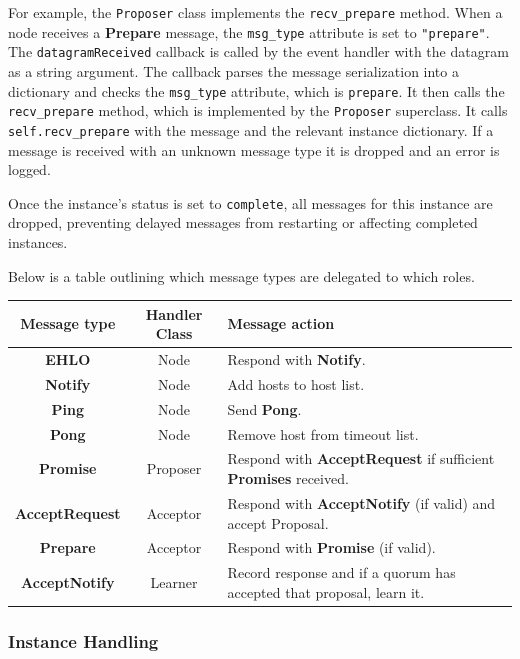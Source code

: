 \documentclass[12pt,twoside,notitlepage]{report}
\newcommand{\msg}[1] {{\bf #1}}         %
\begin{document}
For example, the \verb+Proposer+ class implements the \verb+recv_prepare+ method. When a node
receives a \msg{Prepare} message, the \verb+msg_type+ attribute is set to \verb+"prepare"+. The
\verb+datagramReceived+ callback is called by the event handler with the datagram as a string
argument. The callback parses the message serialization into a dictionary and checks the
\verb+msg_type+ attribute, which is \verb+prepare+. It then calls the \verb+recv_prepare+
method, which is implemented by the \verb+Proposer+ superclass. It calls \verb+self.recv_prepare+
with the message and the relevant instance dictionary. If a message is received with an unknown
message type it is dropped and an error is logged.

Once the instance's status is set to \verb+complete+, all messages for this instance are dropped,
preventing delayed messages from restarting or affecting completed instances.

Below is a table outlining which message types are delegated to which roles. \\

\begin{tabular}{ | c | c | p{7cm} | }
  \hline
  {\bf Message type} & {\bf Handler Class} & {\bf Message action} \\ \hline
  \msg{EHLO} & Node & Respond with \msg{Notify}. \\ \hline
  \msg{Notify} & Node & Add hosts to host list. \\ \hline
  \msg{Ping} & Node & Send \msg{Pong}.  \\ \hline
  \msg{Pong} & Node & Remove host from timeout list. \\ \hline
  \msg{Promise} & Proposer & Respond with \msg{AcceptRequest} if sufficient \msg{Promises} received. \\ \hline
  \msg{AcceptRequest} & Acceptor & Respond with \msg{AcceptNotify} (if valid) and accept Proposal. \\ \hline
  \msg{Prepare} & Acceptor & Respond with \msg{Promise} (if valid). \\ \hline
  \msg{AcceptNotify} & Learner & Record response and if a quorum has accepted that proposal, learn it. \\ \hline
\end{tabular}

\subsubsection{Instance Handling}
\end{document}
